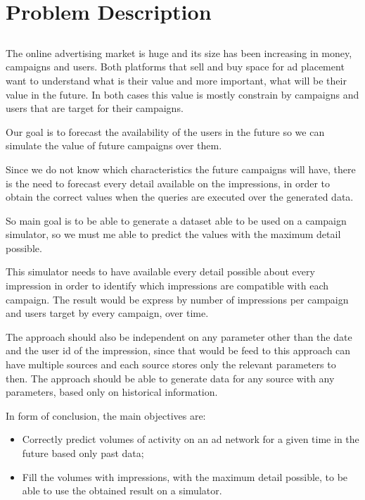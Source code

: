 \chapter{Problem Description}\label{chap:chap3}

\section*{}

The online advertising market is huge and its size has been increasing in money,
campaigns and users. Both platforms that sell and buy space for ad placement
want to understand what is their value and more important, what will be their
value in the future. In both cases this value is mostly constrain by campaigns
and users that are target for their campaigns.

Our goal is to forecast the availability of the users in the future so we can
simulate the value of future campaigns over them.

Since we do not know which characteristics the future campaigns will have, there
is the need to forecast every detail available on the impressions, in order to
obtain the correct values when the queries are executed over the generated data.

So main goal is to be able to generate a dataset able to be used on a campaign
simulator, so we must me able to predict the values with the maximum detail
possible.

This simulator needs to have available every detail possible about every
impression in order to identify which impressions are compatible with each
campaign. The result would be express by number of impressions per campaign and
users target by every campaign, over time.

The approach should also be independent on any parameter other than the
date and the user id of the impression, since that would be feed to this
approach can have multiple sources and each source stores only the relevant
parameters to then. The approach should be able to generate data for any source
with any parameters, based only on historical information.

In form of conclusion, the main objectives are:
\begin{itemize}
\item Correctly predict volumes of activity on an ad network for a given time in
  the future based only past data;
\item Fill the volumes with impressions, with the maximum detail possible, to be
  able to use the obtained result on a simulator.
\end{itemize}

